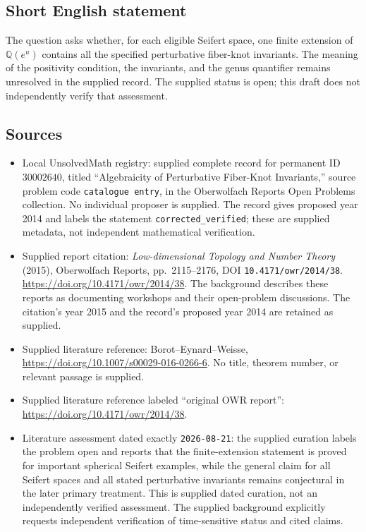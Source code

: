 \documentclass[11pt]{article}
\newcommand{\Q}{\mathbb{Q}}
\begin{document}
\subsection{Short English statement}
The question asks whether, for each eligible Seifert space, one finite extension of \(\Q(e^u)\) contains all the specified perturbative fiber-knot invariants. The meaning of the positivity condition, the invariants, and the genus quantifier remains unresolved in the supplied record. The supplied status is open; this draft does not independently verify that assessment.
\subsection{Sources}
\begin{itemize}
\item Local UnsolvedMath registry: supplied complete record for permanent ID \(30002640\), titled ``Algebraicity of Perturbative Fiber-Knot Invariants,'' source problem code \texttt{catalogue entry}, in the Oberwolfach Reports Open Problems collection. No individual proposer is supplied. The record gives proposed year 2014 and labels the statement \texttt{corrected\_verified}; these are supplied metadata, not independent mathematical verification.
\item Supplied report citation: \emph{Low-dimensional Topology and Number Theory} (2015), Oberwolfach Reports, pp.\ 2115--2176, DOI \texttt{10.4171/owr/2014/38}. \url{https://doi.org/10.4171/owr/2014/38}. The background describes these reports as documenting workshops and their open-problem discussions. The citation's year 2015 and the record's proposed year 2014 are retained as supplied.
\item Supplied literature reference: Borot--Eynard--Weisse, \url{https://doi.org/10.1007/s00029-016-0266-6}. No title, theorem number, or relevant passage is supplied.
\item Supplied literature reference labeled ``original OWR report'': \url{https://doi.org/10.4171/owr/2014/38}.
\item Literature assessment dated exactly \texttt{2026-08-21}: the supplied curation labels the problem open and reports that the finite-extension statement is proved for important spherical Seifert examples, while the general claim for all Seifert spaces and all stated perturbative invariants remains conjectural in the later primary treatment. This is supplied dated curation, not an independently verified assessment. The supplied background explicitly requests independent verification of time-sensitive status and cited claims.
\end{itemize}
\end{document}

